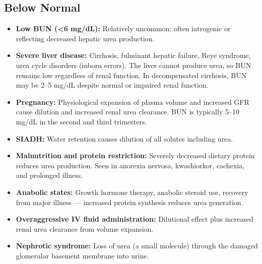 \subsection*{Below Normal}
\begin{itemize}
  \item \textbf{Low BUN (<6 mg/dL):} Relatively uncommon; often iatrogenic or reflecting decreased hepatic urea production.
  \item \textbf{Severe liver disease:} Cirrhosis, fulminant hepatic failure, Reye syndrome, urea cycle disorders (inborn errors). The liver cannot produce urea, so BUN remains low regardless of renal function. In decompensated cirrhosis, BUN may be 2--5 mg/dL despite normal or impaired renal function.
  \item \textbf{Pregnancy:} Physiological expansion of plasma volume and increased GFR cause dilution and increased renal urea clearance. BUN is typically 5--10 mg/dL in the second and third trimesters.
  \item \textbf{SIADH:} Water retention causes dilution of all solutes including urea.
  \item \textbf{Malnutrition and protein restriction:} Severely decreased dietary protein reduces urea production. Seen in anorexia nervosa, kwashiorkor, cachexia, and prolonged illness.
  \item \textbf{Anabolic states:} Growth hormone therapy, anabolic steroid use, recovery from major illness --- increased protein synthesis reduces urea generation.
  \item \textbf{Overaggressive IV fluid administration:} Dilutional effect plus increased renal urea clearance from volume expansion.
  \item \textbf{Nephrotic syndrome:} Loss of urea (a small molecule) through the damaged glomerular basement membrane into urine.
\end{itemize}

